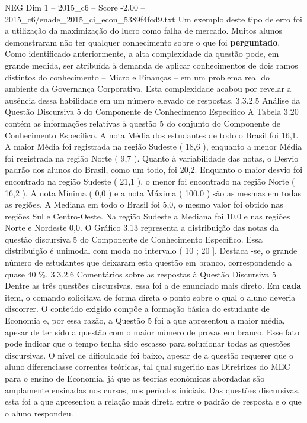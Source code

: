 \begin{textsample}{NEG Dim 1 – 2015\_c6 – Score -2.00 – 2015\_c6/enade\_2015\_ci\_econ\_5389f4fcd9.txt}
Um exemplo deste tipo de erro foi a utilização da maximização do lucro como falha de mercado.
Muitos alunos demonstraram não ter qualquer conhecimento sobre o que foi \textbf{perguntado}.
Como identificado anteriormente, a alta complexidade da questão pode, em grande medida, ser atribuída à demanda de aplicar conhecimentos de dois ramos distintos do conhecimento – Micro e Finanças – em um problema real do ambiente da Governança Corporativa.
Esta complexidade acabou por revelar a ausência dessa habilidade em um número elevado de respostas. 3.3.2.5 Análise da Questão Discursiva 5 do Componente de Conhecimento Específico A Tabela 3.20 contém as informações relativas à questão 5 do conjunto do Componente de Conhecimento Específico.
A nota Média dos estudantes de todo o Brasil foi 16,1.
A maior Média foi registrada na região Sudeste ( 18,6 ), enquanto a menor Média foi registrada na região Norte ( 9,7 ).
Quanto à variabilidade das notas, o Desvio padrão dos alunos do Brasil, como um todo, foi 20,2.
Enquanto o maior desvio foi encontrado na região Sudeste ( 21,1 ), o menor foi encontrado na região Norte ( 16,2 ).
A nota Mínima ( 0,0 ) e a nota Máxima ( 100,0 ) são as mesmas em todas as regiões.
A Mediana em todo o Brasil foi 5,0, o mesmo valor foi obtido nas regiões Sul e Centro-Oeste.
Na região Sudeste a Mediana foi 10,0 e nas regiões Norte e Nordeste 0,0.
O Gráfico 3.13 representa a distribuição das notas da questão discursiva 5 do Componente de Conhecimento Específico.
Essa distribuição é unimodal com moda no intervalo ( 10 ; 20 ].
Destaca -se, o grande número de estudantes que deixaram esta questão em branco, correspondendo a quase 40 \%. 3.3.2.6 Comentários sobre as respostas à Questão Discursiva 5 Dentre as três questões discursivas, essa foi a de enunciado mais direto.
Em \textbf{cada} item, o comando solicitava de forma direta o ponto sobre o qual o aluno deveria discorrer.
O conteúdo exigido compõe a formação básica do estudante de Economia e, por essa razão, a Questão 5 foi a que apresentou a maior média, apesar de ter sido a questão com o maior número de provas em branco.
Esse fato pode indicar que o tempo tenha sido escasso para solucionar todas as questões discursivas.
O nível de dificuldade foi baixo, apesar de a questão requerer que o aluno diferenciasse correntes teóricas, tal qual sugerido nas Diretrizes do MEC para o ensino de Economia, já que as teorias econômicas abordadas são amplamente ensinadas nos cursos, nos períodos iniciais.
Das questões discursivas, esta foi a que apresentou a relação mais direta entre o padrão de resposta e o que o aluno respondeu.

\end{textsample}
